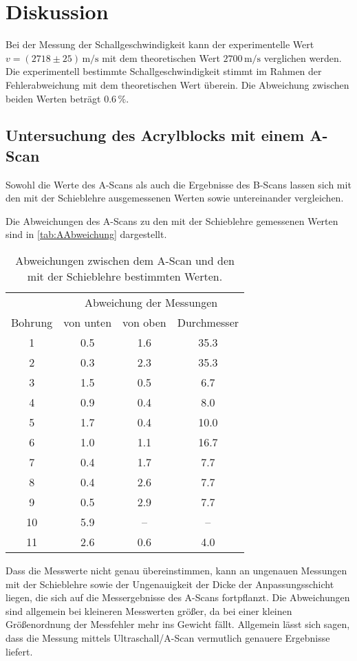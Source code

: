 \section{Diskussion}
\label{sec:Diskussion}

Bei der Messung der Schallgeschwindigkeit kann der experimentelle Wert $v = (2718\pm 25) \, \unit{\m\per\s}$ mit dem theoretischen Wert 
$2700 \,\unit{\m\per\s}$ verglichen werden. Die experimentell bestimmte Schallgeschwindigkeit stimmt im Rahmen der Fehlerabweichung mit 
dem theoretischen Wert überein. Die Abweichung zwischen beiden Werten beträgt $0.6\,\%$. 

\subsection{Untersuchung des Acrylblocks mit einem A-Scan}
Sowohl die Werte des A-Scans als auch die Ergebnisse des B-Scans lassen sich mit den mit der Schieblehre ausgemessenen Werten sowie untereinander 
vergleichen.

Die Abweichungen des A-Scans zu den mit der Schieblehre gemessenen Werten sind in \autoref{tab:AAbweichung} dargestellt. 

\begin{table}
    \centering 
    \caption{Abweichungen zwischen dem A-Scan und den mit der Schieblehre bestimmten Werten.}
\begin{tabular}{c c c c}
    \toprule
    & \multicolumn{3}{c}{Abweichung der Messungen} \\
    Bohrung & von unten & von oben & Durchmesser\\
    \midrule
    1&0.5&1.6&35.3 \\
    2&0.3&2.3&35.3 \\
     3&1.5&0.5&6.7 \\
     4&0.9&0.4&8.0 \\
    5&1.7&0.4&10.0 \\
    6&1.0&1.1&16.7 \\
     7&0.4&1.7&7.7 \\
     8&0.4&2.6&7.7 \\
     9&0.5&2.9&7.7 \\
    10&5.9&--&-- \\
    11&2.6&0.6&4.0 \\
    \bottomrule
\end{tabular}
\label{tab:AAbweichung}
\end{table}
Dass die Messwerte nicht genau übereinstimmen, kann an ungenauen Messungen mit der Schieblehre sowie der Ungenauigkeit der Dicke der Anpassungsschicht 
liegen, die sich auf die Messergebnisse des A-Scans fortpflanzt. Die Abweichungen sind allgemein bei kleineren Messwerten größer, da bei einer kleinen 
Größenordnung der Messfehler mehr ins Gewicht fällt. Allgemein lässt sich sagen, dass die Messung mittels Ultraschall/A-Scan vermutlich genauere Ergebnisse 
liefert.